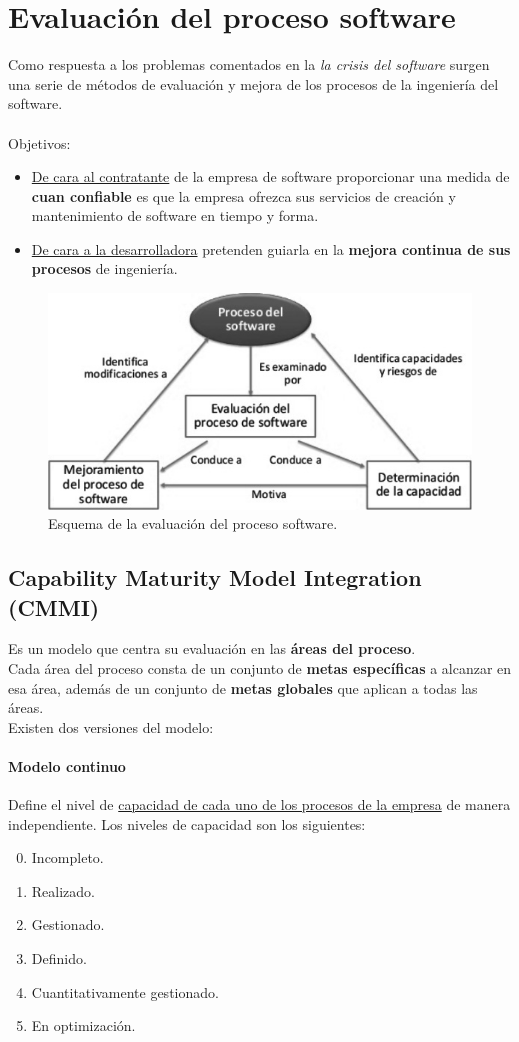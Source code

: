 \section{Evaluación del proceso software}
Como respuesta a los problemas comentados en la \textit{la crisis del software} surgen una serie de métodos de evaluación y mejora de los procesos de la ingeniería del software.
\\\\
Objetivos:
\begin{itemize}
    \item \uline{De cara al contratante} de la empresa de software proporcionar una medida de \textbf{cuan confiable} es que la empresa ofrezca sus servicios de creación y mantenimiento de software en tiempo y forma.
    \item \uline{De cara a la desarrolladora} pretenden guiarla en la \textbf{mejora continua de sus procesos} de ingeniería.
\end{itemize}

\begin{figure}[H]
  \centering
  \includegraphics[width=0.7\linewidth]{Resources/evaluacionSoftware}
  \caption{Esquema de la evaluación del proceso software.}
  \label{fig:evaluacionSoftware}
\end{figure}

\subsection{Capability Maturity Model Integration (CMMI)}
Es un modelo que centra su evaluación en las \textbf{áreas del proceso}.\\
Cada área del proceso consta de un conjunto de \textbf{metas específicas} a alcanzar en esa área, además de un conjunto de \textbf{metas globales} que aplican a todas las áreas.\\
Existen dos versiones del modelo:

\paragraph{Modelo continuo} Define el nivel de \uline{capacidad de cada uno de los procesos de la empresa} de manera independiente. Los niveles de capacidad son los siguientes:
\begin{enumerate}
\setcounter{enumi}{-1}
    \item Incompleto.
    \item Realizado.
    \item Gestionado.
    \item Definido.
    \item Cuantitativamente gestionado.
    \item En optimización.
\end{enumerate}

